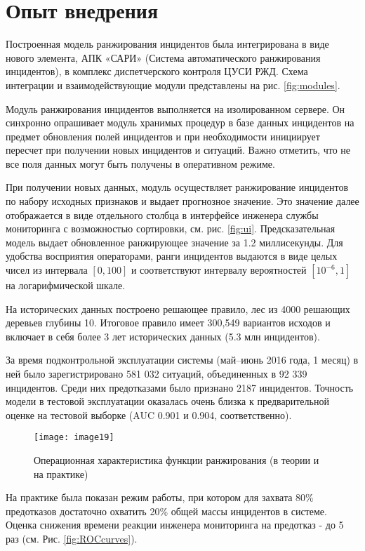 \section{Опыт внедрения}
Построенная модель ранжирования инцидентов была интегрирована в виде нового элемента, АПК «САРИ» (Система автоматического ранжирования инцидентов), в комплекс диспетчерского контроля ЦУСИ РЖД. Схема интеграции и взаимодействующие модули представлены на рис. \ref{fig:modules}.

Модуль ранжирования инцидентов выполняется на изолированном сервере. Он синхронно опрашивает модуль хранимых процедур в базе данных инцидентов на предмет обновления полей инцидентов и при необходимости инициирует пересчет при получении новых инцидентов и ситуаций. Важно отметить, что не все поля данных могут быть получены в оперативном режиме.

При получении новых данных, модуль осуществляет ранжирование инцидентов по набору исходных признаков и выдает прогнозное значение. Это значение далее отображается в виде отдельного столбца в интерфейсе инженера службы мониторинга с возможностью сортировки, см. рис. \ref{fig:ui}. Предсказательная модель выдает обновленное ранжирующее значение за 1.2 миллисекунды. Для удобства восприятия операторами, ранги инцидентов выдаются в виде целых чисел из интервала $[0,100]$ и соответствуют интервалу вероятностей $[10^{-6},1]$ на логарифмической шкале.


На исторических данных построено решающее правило, лес из 4000 решающих деревьев глубины 10.  Итоговое правило имеет 300,549 вариантов исходов и включает в себя более 3 лет исторических данных (5.3 млн инцидентов).

За время подконтрольной эксплуатации системы (май--июнь 2016 года, 1 месяц) в ней было зарегистрировано 581 032 ситуаций, объединенных в 92 339 инцидентов. Среди них предотказами было признано 2187 инцидентов. %
Точность модели в тестовой эксплуатации оказалась очень близка к предварительной оценке на тестовой выборке (AUC 0.901 и 0.904, соответственно).

\begin{figure}
\centering
\texttt{[image: image19]}
\caption{Операционная характеристика функции ранжирования (в теории и на практике)}
\centering
\label{fig:image19}
\end{figure}

На практике была показан режим работы, при котором для захвата 80\% предотказов достаточно охватить 20\% общей массы инцидентов в системе. Оценка снижения времени реакции инженера мониторинга на предотказ - до 5 раз (см. Рис. \ref{fig:ROCcurves}).

